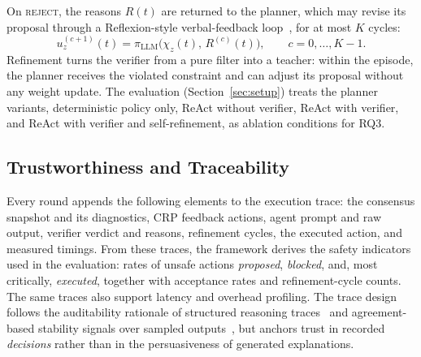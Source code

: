 \documentclass[smartcities,article,submit,moreauthors]{Definitions/mdpi}
\begin{document}
On \textsc{reject}, the reasons $R(t)$ are returned to the planner,
which may revise its proposal through a Reflexion-style verbal-feedback
loop~\cite{shinn2023reflexion}, for at most $K$ cycles:
\begin{equation}
u_z^{(c+1)}(t)=\pi_{\mathrm{LLM}}\bigl(\chi_z(t),\,R^{(c)}(t)\bigr),
\qquad c=0,\dots,K-1.
\label{eq:refinement}
\end{equation}
Refinement turns the verifier from a pure filter into a teacher: within
the episode, the planner receives the violated constraint and can adjust
its proposal without any weight update. The evaluation
(Section~\ref{sec:setup}) treats the planner variants, deterministic
policy only, ReAct without verifier, ReAct with verifier, and ReAct with
verifier and self-refinement, as ablation conditions for RQ3.

\subsection{Trustworthiness and Traceability}
\label{sec:trace}

Every round appends the following elements to the execution trace: the
consensus snapshot and its diagnostics, CRP feedback actions, agent
prompt and raw output, verifier verdict and reasons, refinement cycles,
the executed action, and measured timings. From these traces,
the framework derives the safety indicators used in the evaluation:
rates of unsafe actions \emph{proposed}, \emph{blocked}, and, most
critically, \emph{executed}, together with acceptance rates and
refinement-cycle counts. The same traces also support latency and
overhead profiling. The trace design follows the auditability rationale
of structured reasoning traces~\cite{wei2022cot} and agreement-based
stability signals over sampled outputs~\cite{wang2023selfconsistency},
but anchors trust in recorded \emph{decisions} rather than in the
persuasiveness of generated explanations.
\end{document}

